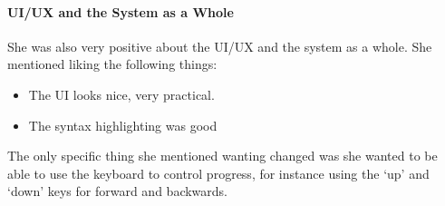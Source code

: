 \paragraph{UI/UX and the System as a Whole}
She was also very positive about the UI/UX and the system as a whole. She mentioned liking the following things:

\begin{itemize}
    \item The UI looks nice, very practical.
    \item The syntax highlighting was good
\end{itemize}

\noindent The only specific thing she mentioned wanting changed was she wanted to be able to use the keyboard to control progress, for instance using the `up' and `down' keys for forward and backwards.





